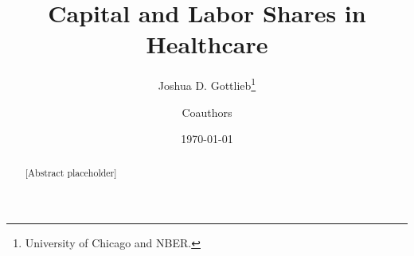 \documentclass[12pt]{article}
\title{Capital and Labor Shares in Healthcare}
\author{Joshua D. Gottlieb\thanks{University of Chicago and NBER.} \and Coauthors}
\date{\today}
\begin{document}
\maketitle

\begin{abstract}
[Abstract placeholder]
\end{abstract}

\doublespacing



\singlespacing


\end{document}
